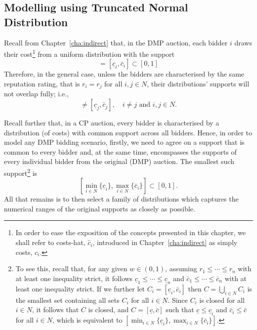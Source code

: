 \subsection{Modelling using Truncated Normal Distribution} %
\label{sub:modeling_using_truncated_normal_distribution_approximation}
Recall from Chapter~\ref{cha:indirect} that, in the DMP auction, each bidder $i$ draws their cost\footnote{In order to ease the exposition of the concepts presented in this chapter, we shall refer to costs-hat, $\hat{c}_i$, introduced in Chapter~\ref{cha:indirect} as simply costs, $c_i$.} from a uniform distribution with the support
\begin{equation*}
  [(1-w)r_i, (1-w)r_i + w] = [\underline{c}_i, \bar{c}_i] \subset [0,1]
\end{equation*}
Therefore, in the general case, unless the bidders are characterised by the same reputation rating, that is $r_i=r_j$ for all $i,j\in N$, their distributions' supports will not overlap fully; i.e.,
\begin{equation*}
  [\underline{c}_i,\bar{c}_i] \neq [\underline{c}_j,\bar{c}_j], \quad i\neq j \text{ and } i,j\in N.
\end{equation*}

Recall further that, in a CP auction, every bidder is characterised by a distribution (of costs) with common support across all bidders. Hence, in order to model any DMP bidding scenario, firstly, we need to agree on a support that is common to every bidder and, at the same time, encompasses the supports of every individual bidder from the original (DMP) auction. The smallest such support\footnote{To see this, recall that, for any given $w\in (0,1)$, assuming $r_1\leq\cdots\leq r_n$ with at least one inequality strict, it follows $\underline{c}_1\leq\cdots\leq\underline{c}_n$ and $\bar{c}_1\leq\cdots\leq\bar{c}_n$ with at least one inequality strict. If we further let $C_i = [\underline{c}_i, \bar{c}_i]$ then $C = \bigcup_{i\in N} C_i$ is the smallest set containing all sets $C_i$ for all $i\in N$. Since $C_i$ is closed for all $i\in N$, it follows that $C$ is closed, and $C = [\underline{c}, \bar{c}]$ such that $\underline{c} \leq \underline{c}_i$ and $\bar{c}_i\leq \bar{c}$ for all $i\in N$, which is equivalent to $[\min_{i\in N}\{\underline{c}_i\}, \max_{i\in N}\{\bar{c}_i\}]$.} is
\begin{equation}
  \label{eq:domain_common_priors_approximation}
  \displaystyle\left[\min_{i\in N}\{\underline{c}_i\}, \max_{i\in N}\{\bar{c}_i\}\right] \subset [0,1].
\end{equation}
All that remains is to then select a family of distributions which captures the numerical ranges of the original supports as closely as possible.

